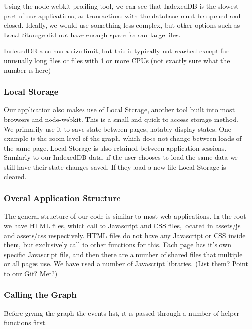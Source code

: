 \documentclass{hmcclinic}
\begin{document}
  Using the node-webkit profiling tool, we can see that IndexedDB is the slowest
  part of our applications, as transactions with the database must be opened and
  closed. Ideally, we would use something less complex, but other options such
  as Local Storage did not have enough space for our large files.

  IndexedDB also has  a size limit, but this is typically not reached except for
  unusually long files or files with 4 or more CPUs (not exactly sure what the
  number is here)

  \subsubsection{Local Storage}

  Our application also makes use of Local Storage, another tool
  built into most browsers and node-webkit. This is a small and quick to access
  storage method. We primarily use it to save state between pages, notably
  display states. One example is the zoom level of the graph, which does not
  change between loads of the same page. Local Storage is also retained between
  application sessions. Similarly to our IndexedDB data, if the user chooses to
  load the same data we still have their state changes saved. If they load a new
  file Local Storage is cleared.

  \subsubsection{Overal Application Structure}

  The general structure of our code is similar to
  most web applications. In the root we have HTML files, which call to
  Javascript and CSS files, located in assets/js and assets/css respectively.
  HTML files do not have any Javascript or CSS inside them, but exclusively call
  to other functions for this. Each page has it's own specific Javascript file,
  and then there are a number of shared files that multiple or all pages use. We
  have used a number of Javascript libraries. (List them? Point to our Git?
  Mer?)
  \subsubsection{Calling the Graph}
  Before giving the graph the events list, it is passed through a number of
  helper functions first. 
  
\end{document}
